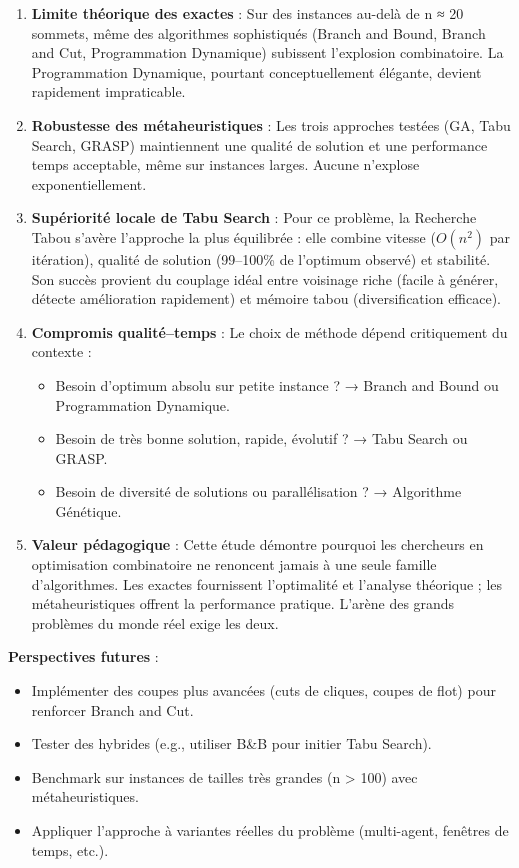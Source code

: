 \documentclass[11pt,a4paper]{article}
\begin{document}
\begin{enumerate}
    \item \textbf{Limite théorique des exactes} : Sur des instances au-delà de n ≈ 20 sommets, même des algorithmes sophistiqués (Branch and Bound, Branch and Cut, Programmation Dynamique) subissent l'explosion combinatoire. La Programmation Dynamique, pourtant conceptuellement élégante, devient rapidement impraticable.
    
    \item \textbf{Robustesse des métaheuristiques} : Les trois approches testées (GA, Tabu Search, GRASP) maintiennent une qualité de solution et une performance temps acceptable, même sur instances larges. Aucune n'explose exponentiellement.
    
    \item \textbf{Supériorité locale de Tabu Search} : Pour ce problème, la Recherche Tabou s'avère l'approche la plus équilibrée : elle combine vitesse ($O(n^2)$ par itération), qualité de solution (99–100\% de l'optimum observé) et stabilité. Son succès provient du couplage idéal entre voisinage riche (facile à générer, détecte amélioration rapidement) et mémoire tabou (diversification efficace).
    
    \item \textbf{Compromis qualité–temps} : Le choix de méthode dépend critiquement du contexte :
    \begin{itemize}
        \item Besoin d'optimum absolu sur petite instance ? → Branch and Bound ou Programmation Dynamique.
        \item Besoin de très bonne solution, rapide, évolutif ? → Tabu Search ou GRASP.
        \item Besoin de diversité de solutions ou parallélisation ? → Algorithme Génétique.
    \end{itemize}
    
    \item \textbf{Valeur pédagogique} : Cette étude démontre pourquoi les chercheurs en optimisation combinatoire ne renoncent jamais à une seule famille d'algorithmes. Les exactes fournissent l'optimalité et l'analyse théorique ; les métaheuristiques offrent la performance pratique. L'arène des grands problèmes du monde réel exige les deux.
\end{enumerate}

\textbf{Perspectives futures} :

\begin{itemize}
    \item Implémenter des coupes plus avancées (cuts de cliques, coupes de flot) pour renforcer Branch and Cut.
    \item Tester des hybrides (e.g., utiliser B\&B pour initier Tabu Search).
    \item Benchmark sur instances de tailles très grandes (n > 100) avec métaheuristiques.
    \item Appliquer l'approche à variantes réelles du problème (multi-agent, fenêtres de temps, etc.).
\end{itemize}

\newpage
\end{document}
